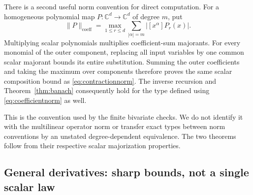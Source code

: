 \documentclass[11pt,a4paper]{article}
\numberwithin{equation}{section}
\theoremstyle{definition}
\theoremstyle{remark}
\newcommand{\C}{\mathbb C}
\begin{document}
There is a second useful norm convention for direct computation. For a
homogeneous polynomial map $P:\C^d\to\C^d$ of degree $m$, put
\begin{equation}
 \|P\|_{\mathrm{coeff}}=
 \max_{1\le r\le d}\sum_{|\alpha|=m}|[x^\alpha]P_r(x)|.
 \label{eq:coefficientnorm}
\end{equation}
Multiplying scalar polynomials multiplies coefficient-sum majorants.
For every monomial of the outer component, replacing all input variables
by one common scalar majorant bounds its entire substitution. Summing the
outer coefficients and taking the maximum over components therefore
proves the same scalar composition bound as
\eqref{eq:contractionnorm}. The inverse recursion and
Theorem~\ref{thm:banach} consequently hold for the type defined using
\eqref{eq:coefficientnorm} as well.

This is the convention used by the finite bivariate checks. We do not
identify it with the multilinear operator norm or transfer exact types
between norm conventions by an unstated degree-dependent equivalence.
The two theorems follow from their respective scalar majorization
properties.

\subsection{General derivatives: sharp bounds, not a single scalar law}
\end{document}
